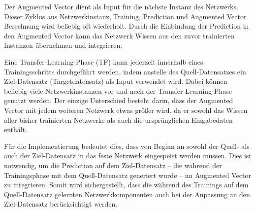Der Augmented Vector dient als Input für die nächste Instanz des Netzwerks. Dieser Zyklus aus Netzwerkinstanz, Training, Prediction und 
Augmented Vector Berechnung wird beliebig oft wiederholt. Durch die Einbindung der Prediction in den Augmented Vector kann das Netzwerk 
Wissen aus den zuvor trainierten Instanzen übernehmen und integrieren.

Eine Transfer-Learning-Phase (TF) kann jederzeit innerhalb eines Trainingsschritts durchgeführt werden, indem anstelle des Quell-Datensatzes 
ein Ziel-Datensatz (Targetdatensatz) als Input verwendet wird. Dabei können beliebig viele Netzwerkinstanzen vor und nach der 
Transfer-Learning-Phase genutzt werden. Der einzige Unterschied besteht darin, dass der Augmented Vector mit jedem weiteren Netzwerk etwas 
größer wird, da er sowohl das Wissen aller bisher trainierten Netzwerke als auch die ursprünglichen Eingabedaten enthält.

Für die Implementierung bedeutet dies, dass von Beginn an sowohl der Quell- als auch der Ziel-Datensatz in das feste Netzwerk eingespeist 
werden müssen. Dies ist notwendig, um die Prediction auf dem Ziel-Datensatz – die während der Trainingsphase mit dem Quell-Datensatz generiert 
wurde – im Augmented Vector zu integrieren. Somit wird sichergestellt, dass die während des Trainings auf dem Quell-Datensatz gelernten 
Netzwerkkomponenten auch bei der Anpassung an den Ziel-Datensatz berücksichtigt werden.
